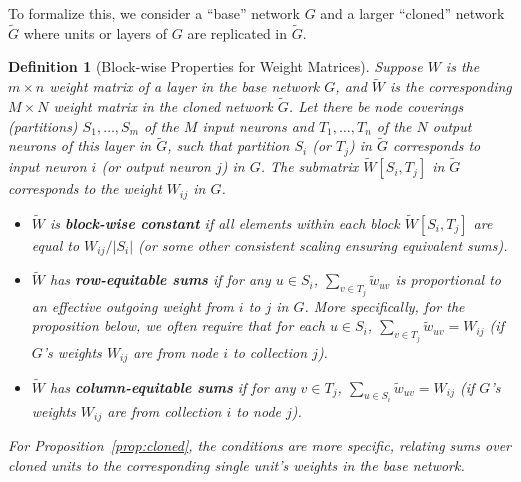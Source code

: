 \documentclass{article}
\newtheorem{definition}{Definition}[section]
\begin{document}
To formalize this, we consider a ``base'' network $G$ and a larger ``cloned'' network $\widetilde{G}$ where units or layers of $G$ are replicated in $\widetilde{G}$.
\begin{definition}[Block-wise Properties for Weight Matrices]
    Suppose $W$ is the $m \times n$ weight matrix of a layer in the base network $G$, and $\widetilde{W}$ is the corresponding $M \times N$ weight matrix in the cloned network $\widetilde{G}$. Let there be node coverings (partitions) $S_1, \dots, S_m$ of the $M$ input neurons and $T_1, \dots, T_n$ of the $N$ output neurons of this layer in $\widetilde{G}$, such that partition $S_i$ (or $T_j$) in $\widetilde{G}$ corresponds to input neuron $i$ (or output neuron $j$) in $G$. The submatrix $\widetilde{W}[S_i, T_j]$ in $\widetilde{G}$ corresponds to the weight $W_{ij}$ in $G$.
    \begin{itemize}
        \item $\widetilde{W}$ is \textbf{block-wise constant} if all elements within each block $\widetilde{W}[S_i, T_j]$ are equal to $W_{ij}/|S_i|$ (or some other consistent scaling ensuring equivalent sums).
        \item $\widetilde{W}$ has \textbf{row-equitable sums} if for any $u \in S_i$, $\sum_{v \in T_j} \widetilde{w}_{uv}$ is proportional to an effective outgoing weight from $i$ to $j$ in $G$. More specifically, for the proposition below, we often require that for each $u \in S_i$, $\sum_{v \in T_j} \widetilde{w}_{uv} = W_{ij}$ (if $G$'s weights $W_{ij}$ are from node $i$ to collection $j$).
        \item $\widetilde{W}$ has \textbf{column-equitable sums} if for any $v \in T_j$, $\sum_{u \in S_i} \widetilde{w}_{uv} = W_{ij}$ (if $G$'s weights $W_{ij}$ are from collection $i$ to node $j$).
    \end{itemize}
    For Proposition~\ref{prop:cloned}, the conditions are more specific, relating sums over cloned units to the corresponding single unit's weights in the base network.
\end{definition}
\end{document}
